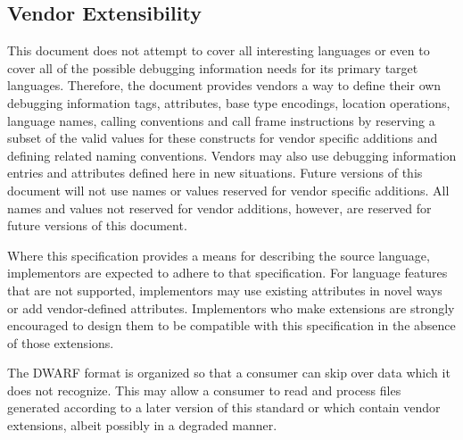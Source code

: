 \subsection{Vendor Extensibility}
\eb
This document does not attempt to cover all interesting
languages or even to cover all of the possible debugging
information needs for its primary target languages. 
Therefore,
the document provides vendors a way to define their own
debugging information tags, attributes, base type encodings,
location operations, language names, calling conventions and
call frame instructions by reserving a subset of the valid
values for these constructs for vendor specific additions
and defining related naming conventions. 
Vendors may also use
debugging information entries and attributes defined here in
new situations. 
Future versions of this document will not use
names or values reserved for vendor specific additions. 
All
names and values not reserved for vendor additions, however,
are reserved for future versions of this document.

\bb
Where this specification provides a means for
\eb
describing the source language, implementors are expected
to adhere to that specification. 
For language features that
are not supported, implementors may use existing attributes
in novel ways or add vendor-defined attributes. 
Implementors
who make extensions are strongly encouraged to design them
to be compatible with this specification in the absence of
those extensions.

The DWARF format is organized so that a consumer can skip over
data which it does not recognize. 
This may allow a consumer
to read and process files generated according to a later
version of this standard or which contain vendor extensions,
albeit possibly in a degraded manner.

